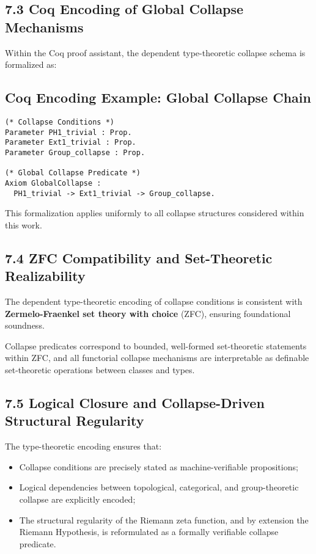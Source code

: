 \documentclass[11pt]{article}
\begin{document}
\subsection*{7.3 Coq Encoding of Global Collapse Mechanisms}

Within the Coq proof assistant, the dependent type-theoretic collapse schema is formalized as:

\subsection*{Coq Encoding Example: Global Collapse Chain}

\begin{lstlisting}[language=Coq, caption=Type-Theoretic Collapse Formalization, captionpos=b]
(* Collapse Conditions *)
Parameter PH1_trivial : Prop.
Parameter Ext1_trivial : Prop.
Parameter Group_collapse : Prop.

(* Global Collapse Predicate *)
Axiom GlobalCollapse :
  PH1_trivial -> Ext1_trivial -> Group_collapse.
\end{lstlisting}

This formalization applies uniformly to all collapse structures considered within this work.

\subsection*{7.4 ZFC Compatibility and Set-Theoretic Realizability}

The dependent type-theoretic encoding of collapse conditions is consistent with \textbf{Zermelo-Fraenkel set theory with choice} (ZFC), ensuring foundational soundness.

Collapse predicates correspond to bounded, well-formed set-theoretic statements within ZFC, and all functorial collapse mechanisms are interpretable as definable set-theoretic operations between classes and types.

\subsection*{7.5 Logical Closure and Collapse-Driven Structural Regularity}

The type-theoretic encoding ensures that:

\begin{itemize}
    \item Collapse conditions are precisely stated as machine-verifiable propositions;
    \item Logical dependencies between topological, categorical, and group-theoretic collapse are explicitly encoded;
    \item The structural regularity of the Riemann zeta function, and by extension the Riemann Hypothesis, is reformulated as a formally verifiable collapse predicate.
\end{itemize}
\end{document}
